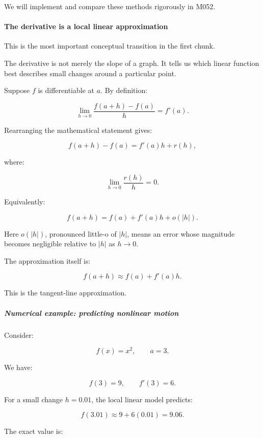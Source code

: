We will implement and compare these methods rigorously in M052.

\paragraph{The derivative is a local linear approximation}\label{01-foundations-i-ch020-the-derivative-is-a-local-linear-approximation}

\hypertarget{01-foundations-i-ch020-the-derivative-is-a-local-linear-approximation}{}

This is the most important conceptual transition in the first chunk.

The derivative is not merely the slope of a graph. It tells us which linear function best describes small changes around a particular point.

Suppose \(f\) is differentiable at \(a\). By definition:

\[
\lim_{h\to0} \frac{f(a+h)-f(a)}h=f'(a).
\]

Rearranging the mathematical statement gives:

\[
f(a+h)-f(a)=f'(a)h+r(h),
\]

where:

\[
\lim_{h\to0}\frac{r(h)}h=0.
\]

Equivalently:

\[
\boxed{f(a+h)=f(a)+f'(a)h+o(|h|)}.
\]

Here \(o(|h|)\), pronounced little-o of \(|h|\), means an error whose magnitude becomes negligible relative to \(|h|\) as \(h\to0\).

The approximation itself is:

\[
\boxed{f(a+h)\approx f(a)+f'(a)h}.
\]

This is the tangent-line approximation.

\subparagraph{Numerical example: predicting nonlinear motion}\label{01-foundations-i-ch020-numerical-example-predicting-nonlinear-motion}

\hypertarget{01-foundations-i-ch020-numerical-example-predicting-nonlinear-motion}{}

Consider:

\[
f(x)=x^2,\qquad a=3.
\]

We have:

\[
f(3)=9,\qquad f'(3)=6.
\]

For a small change \(h=0.01\), the local linear model predicts:

\[
f(3.01)\approx9+6(0.01)=9.06.
\]

The exact value is:

